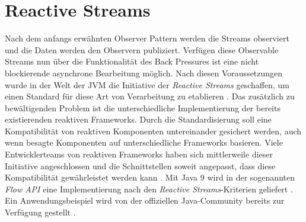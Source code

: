 \section{Reactive Streams}
 Nach dem anfangs erwähnten Observer Pattern werden die Streams observiert und die Daten werden den Observern publiziert. Verfügen diese Observable Streams nun über die Funktionalität des Back Pressures ist eine nicht blockierende asynchrone Bearbeitung möglich. Nach diesen Voraussetzungen wurde in der Welt der JVM die Initiative der \textit{Reactive Streams} geschaffen, um einen Standard für diese Art von Verarbeitung zu etablieren \cite{rsmain}. Das zusätzlich zu bewältigenden Problem ist die unterschiedliche Implementierung der bereits existierenden reaktiven Frameworks. Durch die Standardisierung soll eine Kompatibilität von reaktiven Komponenten untereinander gesichert werden, auch wenn besagte Komponenten auf unterschiedliche Frameworks basieren. Viele Entwicklerteams von reaktiven Frameworks haben sich mittlerweile dieser Initiative angeschlossen und die Schnittstellen soweit angepasst, dass diese Kompatibilität gewährleistet werden kann \cite{rslsting}. Mit Java 9 wird in der sogenannten \textit{Flow API} eine Implementierung nach den \textit{Reactive Streams}-Kriterien geliefert \cite{flowdoc}. Ein Anwendungsbeispiel wird von der offiziellen Java-Community bereits zur Verfügung gestellt \cite{flowexmpl}. 